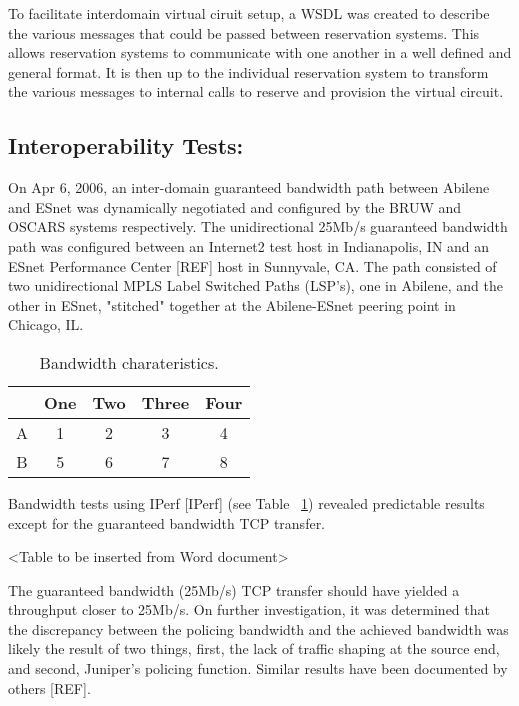 \documentclass[conference]{IEEEtran}
\begin{document}
To facilitate interdomain virtual ciruit setup, 
a WSDL was created to describe the various
messages that could be passed between reservation systems. This allows
reservation systems to communicate with one another in a
well defined and general format. It is then up to the individual reservation system to 
transform the various messages to internal calls to reserve and provision the virtual circuit.

\subsection{Interoperability Tests: }

On Apr 6, 2006, an inter-domain guaranteed bandwidth path between Abilene and 
ESnet was dynamically negotiated and configured by the BRUW and OSCARS systems 
respectively. The unidirectional 25Mb/s guaranteed bandwidth path was 
configured between an Internet2 test host in Indianapolis, IN and an ESnet 
Performance Center [REF] host in Sunnyvale, CA.  The path consisted of two 
unidirectional MPLS Label Switched Paths (LSP's), one in Abilene, and the 
other in ESnet, "stitched" together at the Abilene-ESnet peering point in 
Chicago, IL.

\begin{table}
 \centering
 {\scriptsize
 \begin{tabular}{|c|c|c|c|c|}
 \hline
   & One & Two & Three & Four \\ \hline \hline
 A & 1   & 2   &   3   & 4    \\ \hline 
 B & 5   & 6   &   7   & 8    \\ \hline 
 \end{tabular}
 }
 \caption{Bandwidth charateristics.}
 \label{tab:bandwidth}
\end{table}

Bandwidth tests using IPerf [IPerf] (see Table ~\ref{tab:bandwidth}) revealed predictable results except for the guaranteed bandwidth TCP transfer.

<Table to be inserted from Word document>

The guaranteed bandwidth (25Mb/s) TCP transfer should have yielded a 
throughput closer to 25Mb/s.  On further investigation, it was determined 
that the 
discrepancy between the policing bandwidth and the achieved bandwidth was 
likely the result of two things, first, the lack of traffic shaping at the 
source end, and second, Juniper's policing function.  Similar results have 
been documented by others [REF].
\end{document}
